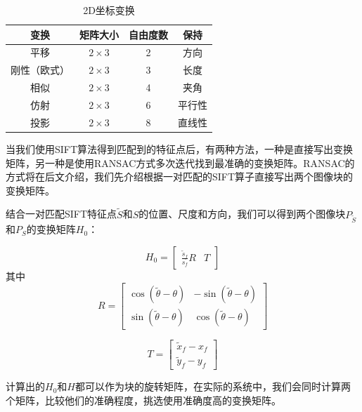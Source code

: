 \begin{table}[h]
\centering
\begin{tabular}{|c|c|c|c|}
\hline
\textbf{变换} & \textbf{矩阵大小} & \textbf{自由度数} & \textbf{保持} \\ \hline
平移          &   \(2\times{3}\)	& 2             & 方向          \\ \hline
刚性（欧式）    &   \(2\times{3}\) & 3             & 长度          \\ \hline
相似          &   \(2\times{3}\)  & 4             & 夹角          \\ \hline
仿射          &   \(2\times{3}\)  & 6             & 平行性         \\ \hline
投影          &   \(2\times{3}\)   & 8             & 直线性         \\ \hline
\end{tabular}
\caption{2D坐标变换}
\label{2dtrans}
\end{table}


当我们使用SIFT算法得到匹配到的特征点后，有两种方法，一种是直接写出变换矩阵，另一种是使用RANSAC方式多次迭代找到最准确的变换矩阵。RANSAC的方式将在后文介绍，我们先介绍根据一对匹配的SIFT算子直接写出两个图像块的变换矩阵。

结合一对匹配SIFT特征点\(\tilde{S}\)和\(S\)的位置、尺度和方向，我们可以得到两个图像块\(P_{\tilde{S}}\)和\(P_S\)的变换矩阵\(H_0\)：

\begin{equation}
	H_0 = 
	\begin{bmatrix}
	\frac{\tilde{s}_f}{s_f} R & T
	\end{bmatrix}
\end{equation}
其中
\begin{equation}
	R = 
	\begin{bmatrix}
		\cos{(\tilde{\theta}-\theta)} & -\sin{(\tilde{\theta}-\theta)} \\
		\sin{(\tilde{\theta}-\theta)} & \cos{(\tilde{\theta}-\theta)} 
	\end{bmatrix}
\end{equation}

\begin{equation}
	T = 
	\begin{bmatrix}
		\tilde{x}_f - x_f \\
		\tilde{y}_f - y_f
	\end{bmatrix}
\end{equation}

计算出的\(H_0\)和\(H\)都可以作为块的旋转矩阵，在实际的系统中，我们会同时计算两个矩阵，比较他们的准确程度，挑选使用准确度高的变换矩阵。


